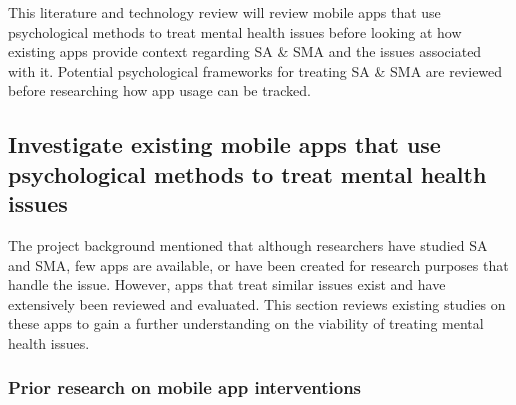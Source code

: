 \documentclass[12pt]{article}
\begin{document}
This literature and technology review will review mobile apps that use psychological methods to treat mental 
health issues before looking at how existing apps provide context regarding SA \& SMA and
the issues associated with it. Potential psychological frameworks for treating SA \& SMA are reviewed 
before researching how app usage can be tracked.




\subsection{Investigate existing mobile apps that use psychological methods to treat mental health issues}

The project background mentioned that although researchers have studied SA and SMA, few apps are available, 
or have been created for research purposes that handle the issue. However, apps that treat similar 
issues exist and have extensively been reviewed and evaluated. This section reviews existing
studies on these apps to gain a further understanding on the viability of treating mental health issues.


\subsubsection{Prior research on mobile app interventions}
\end{document}
